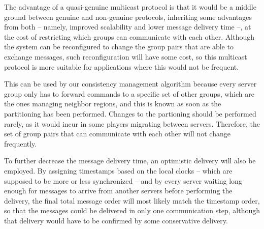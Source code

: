 \documentclass[]{usiinfprospectus}
\begin{document}
The advantage of a quasi-genuine multicast protocol is that it would be a middle ground between genuine and non-genuine protocols, inheriting some advantages from both -- namely, improved scalability and lower message delivery time --, at the cost of restricting which groups can communicate with each other. Although the system can be reconfigured to change the group pairs that are able to exchange messages, such reconfiguration will have some cost, so this multicast protocol is more suitable for applications where this would not be frequent.

This can be used by our consistency management algorithm because every server group only has to forward commands to a specific set of other groups, which are the ones managing neighbor regions, and this is known as soon as the partitioning has been performed. Changes to the partioning should be performed rarely, as it would incur in some players migrating between servers. Therefore, the set of group pairs that can communicate with each other will not change frequently.

To further decrease the message delivery time, an optimistic delivery will also be employed. By assigning timestamps based on the local clocks -- which are supposed to be more or less synchronized -- and by every server waiting long enough for messages to arrive from another servers before performing the delivery, the final total message order will most likely match the timestamp order, so that the messages could be delivered in only one communication step, although that delivery would have to be confirmed by some conservative delivery.
\end{document}
